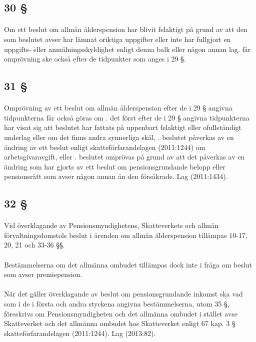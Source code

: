 \documentclass[a4paper,notitlepage,openany,10pt]{book}
\begin{document}
\subsection*{30 §}
\paragraph*{}
Om ett beslut om allmän ålderspension har blivit felaktigt på grund av att den som beslutet avser har lämnat oriktiga uppgifter eller inte har fullgjort en uppgifts- eller anmälningsskyldighet enligt denna balk eller någon annan lag, får omprövning ske också efter de tidpunkter som anges i 29 §.
\subsection*{31 §}
\paragraph*{}
Omprövning av ett beslut om allmän ålderspension efter de i 29 § angivna tidpunkterna får också göras om
. det först efter de i 29 § angivna tidpunkterna har visat sig att beslutet har fattats på uppenbart felaktigt eller ofullständigt underlag eller om det finns andra synnerliga skäl,
. beslutet påverkas av en ändring av ett beslut enligt skatteförfarandelagen (2011:1244) om arbetsgivaravgift, eller
. beslutet omprövas på grund av att det påverkas av en ändring som har gjorts av ett beslut om pensionsgrundande belopp eller pensionsrätt som avser någon annan än den försäkrade.
Lag (2011:1434).
\subsection*{32 §}
\paragraph*{}
Vid överklagande av Pensionsmyndighetens, Skatteverkets och allmän förvaltningsdomstols beslut i ärenden om allmän ålderspension tillämpas 10-17, 20, 21 och 33-36 §§.
\paragraph*{}
Bestämmelserna om det allmänna ombudet tillämpas dock inte i fråga om beslut som avser premiepension.
\paragraph*{}
När det gäller överklagande av beslut om pensionsgrundande inkomst ska vad som i de i första och andra styckena angivna bestämmelserna, utom 35 §, föreskrivs om Pensionsmyndigheten och det allmänna ombudet i stället avse Skatteverket och det allmänna ombudet hos Skatteverket enligt 67 kap. 3 § skatteförfarandelagen (2011:1244).
Lag (2013:82).
\end{document}
